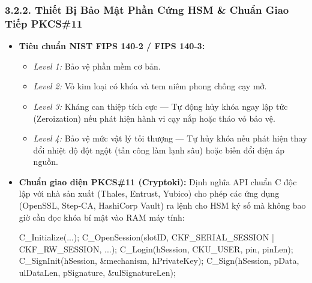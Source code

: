 \documentclass[
]{article}
\newenvironment{Shaded}{}{}
\newcommand{\NormalTok}[1]{#1}
\newcommand{\OperatorTok}[1]{\textcolor[rgb]{0.40,0.40,0.40}{#1}}
\providecommand{\tightlist}{%
  \setlength{\itemsep}{0pt}\setlength{\parskip}{0pt}}
\begin{document}
\subsubsection{3.2.2. Thiết Bị Bảo Mật Phần Cứng HSM \& Chuẩn Giao Tiếp
PKCS\#11}\label{thiux1ebft-bux1ecb-bux1ea3o-mux1eadt-phux1ea7n-cux1ee9ng-hsm-chuux1ea9n-giao-tiux1ebfp-pkcs11}

\begin{itemize}
\item
  \textbf{Tiêu chuẩn NIST FIPS 140-2 / FIPS 140-3:}

  \begin{itemize}
  \tightlist
  \item
    \emph{Level 1:} Bảo vệ phần mềm cơ bản.
  \item
    \emph{Level 2:} Vỏ kim loại có khóa và tem niêm phong chống cạy mở.
  \item
    \emph{Level 3:} Kháng can thiệp tích cực --- Tự động hủy khóa ngay
    lập tức (Zeroization) nếu phát hiện hành vi cạy nắp hoặc tháo vỏ bảo
    vệ.
  \item
    \emph{Level 4:} Bảo vệ mức vật lý tối thượng --- Tự hủy khóa nếu
    phát hiện thay đổi nhiệt độ đột ngột (tấn công làm lạnh sâu) hoặc
    biến đổi điện áp nguồn.
  \end{itemize}
\item
  \textbf{Chuẩn giao diện PKCS\#11 (Cryptoki):} Định nghĩa API chuẩn C
  độc lập với nhà sản xuất (Thales, Entrust, Yubico) cho phép các ứng
  dụng (OpenSSL, Step-CA, HashiCorp Vault) ra lệnh cho HSM ký số mà
  không bao giờ cần đọc khóa bí mật vào RAM máy tính:

\begin{Shaded}
\begin{Highlighting}[]
\NormalTok{C\_Initialize}\OperatorTok{(...);}
\NormalTok{C\_OpenSession}\OperatorTok{(}\NormalTok{slotID}\OperatorTok{,}\NormalTok{ CKF\_SERIAL\_SESSION }\OperatorTok{|}\NormalTok{ CKF\_RW\_SESSION}\OperatorTok{,} \OperatorTok{...);}
\NormalTok{C\_Login}\OperatorTok{(}\NormalTok{hSession}\OperatorTok{,}\NormalTok{ CKU\_USER}\OperatorTok{,}\NormalTok{ pin}\OperatorTok{,}\NormalTok{ pinLen}\OperatorTok{);}
\NormalTok{C\_SignInit}\OperatorTok{(}\NormalTok{hSession}\OperatorTok{,} \OperatorTok{\&}\NormalTok{mechanism}\OperatorTok{,}\NormalTok{ hPrivateKey}\OperatorTok{);}
\NormalTok{C\_Sign}\OperatorTok{(}\NormalTok{hSession}\OperatorTok{,}\NormalTok{ pData}\OperatorTok{,}\NormalTok{ ulDataLen}\OperatorTok{,}\NormalTok{ pSignature}\OperatorTok{,} \OperatorTok{\&}\NormalTok{ulSignatureLen}\OperatorTok{);}
\end{Highlighting}
\end{Shaded}
\end{itemize}
\end{document}
